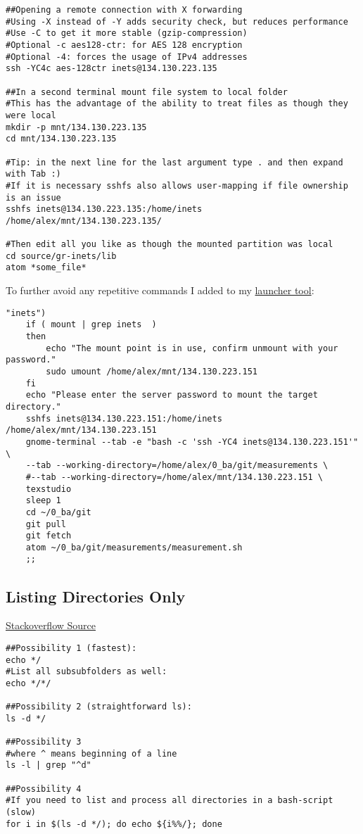 \documentclass{article}
\begin{document}
\begin{verbatim}
##Opening a remote connection with X forwarding
#Using -X instead of -Y adds security check, but reduces performance
#Use -C to get it more stable (gzip-compression)
#Optional -c aes128-ctr: for AES 128 encryption
#Optional -4: forces the usage of IPv4 addresses
ssh -YC4c aes-128ctr inets@134.130.223.135

##In a second terminal mount file system to local folder
#This has the advantage of the ability to treat files as though they were local
mkdir -p mnt/134.130.223.135
cd mnt/134.130.223.135

#Tip: in the next line for the last argument type . and then expand with Tab :)
#If it is necessary sshfs also allows user-mapping if file ownership is an issue
sshfs inets@134.130.223.135:/home/inets /home/alex/mnt/134.130.223.135/

#Then edit all you like as though the mounted partition was local
cd source/gr-inets/lib
atom *some_file*

\end{verbatim}

To further avoid any repetitive commands I added to my \href{http://alexander-pastor.de/convenient-linux-game-launcher/}{launcher tool}:

\begin{verbatim}
"inets")
	if ( mount | grep inets  )
	then
		echo "The mount point is in use, confirm unmount with your password."
		sudo umount /home/alex/mnt/134.130.223.151
	fi
	echo "Please enter the server password to mount the target directory."
	sshfs inets@134.130.223.151:/home/inets /home/alex/mnt/134.130.223.151
	gnome-terminal --tab -e "bash -c 'ssh -YC4 inets@134.130.223.151'" \
	--tab --working-directory=/home/alex/0_ba/git/measurements \
	#--tab --working-directory=/home/alex/mnt/134.130.223.151 \
	texstudio
	sleep 1
	cd ~/0_ba/git
	git pull
	git fetch
	atom ~/0_ba/git/measurements/measurement.sh
	;;
\end{verbatim}

\subsection{Listing Directories Only}

\href{https://stackoverflow.com/questions/14352290/listing-only-directories-using-ls-in-bash-an-examination}{Stackoverflow Source}

\begin{verbatim}
##Possibility 1 (fastest):
echo */
#List all subsubfolders as well:
echo */*/

##Possibility 2 (straightforward ls):
ls -d */

##Possibility 3
#where ^ means beginning of a line
ls -l | grep "^d"

##Possibility 4
#If you need to list and process all directories in a bash-script (slow)
for i in $(ls -d */); do echo ${i%%/}; done
\end{verbatim}
\end{document}
